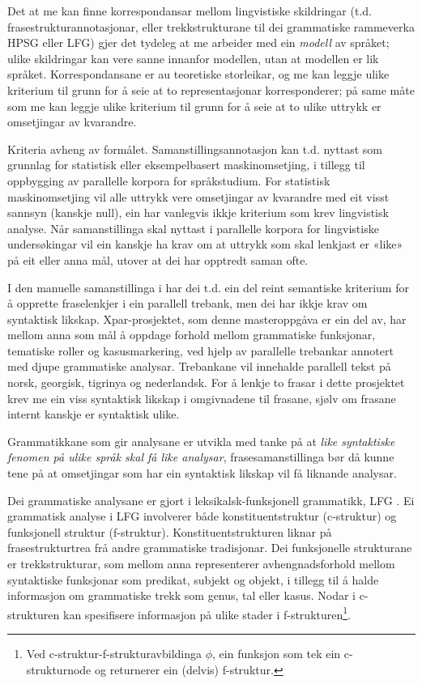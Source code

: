 \documentclass[12pt,a4paper,oneside,draft]{report}
\begin{document}
Det at me kan finne korrespondansar mellom lingvistiske skildringar
 (t.d. frasestrukturannotasjonar, eller trekkstrukturane til dei
 grammatiske rammeverka HPSG eller LFG) gjer det tydeleg at me
 arbeider med ein \emph{modell} av språket; ulike skildringar kan vere
 sanne innanfor modellen, utan at modellen er lik
 språket. Korrespondansane er au teoretiske storleikar, og me kan
 leggje ulike kriterium til grunn for å seie at to representasjonar
 korresponderer; på same måte som me kan leggje ulike kriterium til
 grunn for å seie at to ulike uttrykk er omsetjingar av kvarandre.

Kriteria avheng av formålet. Samanstillingsannotasjon kan t.d. nyttast
 som grunnlag for statistisk eller eksempelbasert maskinomsetjing, i
 tillegg til oppbygging av parallelle korpora for språkstudium.  For
 statistisk maskinomsetjing vil alle uttrykk vere omsetjingar av
 kvarandre med eit visst sannsyn (kanskje null), ein har vanlegvis
 ikkje kriterium som krev lingvistisk analyse. Når samanstillinga skal
 nyttast i parallelle korpora for lingvistiske undersøkingar vil ein
 kanskje ha krav om at uttrykk som skal lenkjast er «like» på eit
 eller anna mål, utover at dei har opptredt saman ofte.

I den manuelle samanstillinga i \citet{samuelsson2006pap} har dei
 t.d. ein del reint semantiske kriterium for å opprette fraselenkjer i
 ein parallell trebank, men dei har ikkje krav om syntaktisk likskap.
 Xpar-prosjektet, som denne masteroppgåva er ein del av, har mellom
 anna som mål å oppdage forhold mellom grammatiske funksjonar,
 tematiske roller og kasusmarkering, ved hjelp av parallelle trebankar
 annotert med djupe grammatiske analysar. Trebankane vil innehalde
 parallell tekst på norsk, georgisk, tigrinya og nederlandsk.  For å
 lenkje to frasar i dette prosjektet krev me ein viss syntaktisk
 likskap i omgivnadene til frasane, sjølv om frasane internt kanskje
 er syntaktisk ulike.

Grammatikkane som gir analysane er utvikla med tanke på at \emph{like  syntaktiske fenomen på ulike språk skal få like analysar},
 frasesamanstillinga bør då kunne tene på at omsetjingar som har ein
 syntaktisk likskap vil få liknande analysar.

Dei grammatiske analysane er gjort i leksikalsk-funksjonell
 grammatikk, LFG \citep{bresnan2001lfs}. Ei grammatisk analyse i LFG
 involverer både konstituentstruktur (c\hyp{}struktur) og funksjonell
 struktur (f\hyp{}struktur). Konstituentstrukturen liknar på
 frasestrukturtrea frå andre grammatiske tradisjonar. Dei funksjonelle
 strukturane er trekkstrukturar, som mellom anna representerer
 avhengnadsforhold mellom syntaktiske funksjonar som predikat, subjekt
 og objekt, i tillegg til å halde informasjon om grammatiske trekk som
 genus, tal eller kasus. Nodar i c\hyp{}strukturen kan spesifisere
 informasjon på ulike stader i f\hyp{}strukturen\footnote{Ved c\hyp{}struktur-f\hyp{}strukturavbildinga $\phi$, ein funksjon som
        tek ein c\hyp{}strukturnode og returnerer ein (delvis) f\hyp{}struktur. }.
\end{document}
